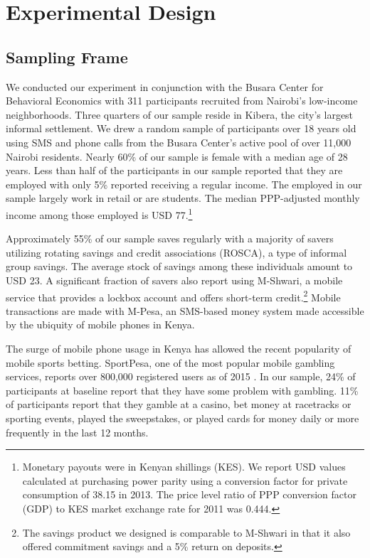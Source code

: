 \documentclass[11pt]{article}
\begin{document}
\section{Experimental Design} \label{sec:design}

	\subsection{Sampling Frame}

		We conducted our experiment in conjunction with the Busara Center for Behavioral Economics with 311 participants recruited from Nairobi's low-income neighborhoods. Three quarters of our sample reside in Kibera, the city's largest informal settlement. We drew a random sample of participants over 18 years old using SMS and phone calls from the Busara Center's active pool of over 11,000 Nairobi residents. Nearly 60\% of our sample is female with a median age of 28 years. Less than half of the participants in our sample reported that they are employed with only 5\% reported receiving a regular income. The employed in our sample largely work in retail or are students. The median PPP-adjusted monthly income among those employed is USD 77.\footnote{Monetary payouts were in Kenyan shillings (KES). We report USD values calculated at purchasing power parity using a conversion factor for private consumption of 38.15 in 2013. The price level ratio of PPP conversion factor (GDP) to KES market exchange rate for 2011 was 0.444.}

		Approximately 55\% of our sample saves regularly with a majority of savers utilizing rotating savings and credit associations (ROSCA), a type of informal group savings. The average stock of savings among these individuals amount to USD 23. A significant fraction of savers also report using M-Shwari, a mobile service that provides a lockbox account and offers short-term credit.\footnote{The savings product we designed is comparable to M-Shwari in that it also offered commitment savings and a 5\% return on deposits.} Mobile transactions are made with M-Pesa, an SMS-based money system made accessible by the ubiquity of mobile phones in Kenya.

		The surge of mobile phone usage in Kenya has allowed the recent popularity of mobile sports betting. SportPesa, one of the most popular mobile gambling services, reports over 800,000 registered users as of 2015 \parencite{kemibaro_sportpesa_2015}. In our sample, 24\% of participants at baseline report that they have some problem with gambling. 11\% of participants report that they gamble at a casino, bet money at racetracks or sporting events, played the sweepstakes, or played cards for money daily or more frequently in the last 12 months.
\end{document}
